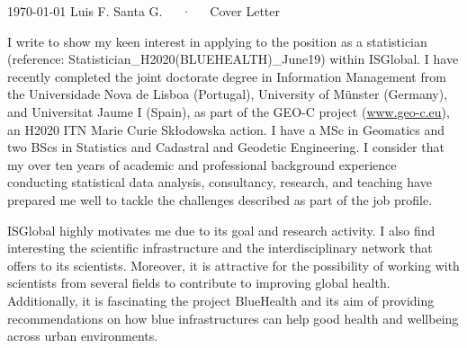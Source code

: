 \documentclass[11pt, a4paper]{awesome-cv}
\begin{document}
\makecvheader[R]

\makecvfooter
  {\today}
    {Luis F. Santa G.~~~·~~~Cover Letter}
  {}

\makelettertitle

\begin{cvletter}
I write to show my keen interest in applying to the position as a statistician (reference: Statistician\_H2020(BLUEHEALTH)\_June19) within ISGlobal. I have recently completed the joint doctorate degree in Information Management from the Universidade Nova de Lisboa (Portugal), University of Münster (Germany), and Universitat Jaume I (Spain), as part of the GEO-C project (\url{www.geo-c.eu}), an H2020 ITN Marie Curie Skłodowska action. I have a MSc in Geomatics and two BScs in Statistics and Cadastral and Geodetic Engineering. I consider that my over ten years of academic and professional background experience conducting statistical data analysis, consultancy, research, and teaching have prepared me well to tackle the challenges described as part of the job profile.\par
ISGlobal highly motivates me due to its goal and research activity. I also find interesting the scientific infrastructure and the interdisciplinary network that offers to its scientists. Moreover, it is attractive for the possibility of working with scientists from several fields to contribute to improving global health.  Additionally, it is fascinating the project BlueHealth and its aim of providing recommendations on how blue infrastructures can help good health and wellbeing across urban environments. \par

\end{cvletter}
\end{document}
